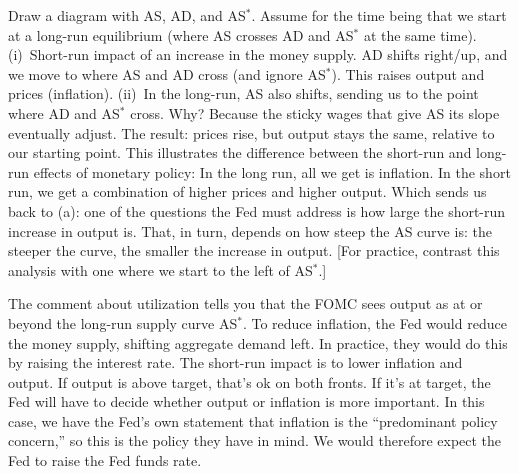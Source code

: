 \documentclass[letterpaper,12pt]{exam}
\begin{document}
\begin{questions}
\begin{solution}
\begin{parts}
\item Draw a diagram with AS, AD, and AS$^*$.
Assume for the time being that we start at a long-run equilibrium
(where AS crosses AD and AS$^*$ at the same time).
(i)~Short-run impact of an increase in the money supply.
AD shifts right/up, and we move to where AS and AD cross (and
ignore AS$^*$). This raises output and prices (inflation).
(ii)~In the long-run, AS also shifts, sending us to the point where AD and AS$^*$
cross. Why? Because the sticky wages that give AS its slope
eventually adjust. The result:
prices rise, but output stays the same, relative to our starting
point. This illustrates the difference between the short-run and
long-run effects of monetary policy:  In the long run, all we get is
inflation.  In the short run, we get a combination of higher prices
and higher output. Which sends us back to (a):  one of the questions
the Fed must address is how large the short-run increase in output
is.  That, in turn, depends on how steep the AS curve is:  the
steeper the curve, the smaller the increase in output. [For
practice, contrast this analysis with one where we start to the left
of AS$^*$.]

\item The comment about utilization tells you that
the FOMC sees output as at or beyond the long-run supply curve AS$^*$.
To reduce inflation, the Fed would reduce the money supply,
shifting aggregate demand left.
In practice, they would do this by raising the interest rate.
The short-run impact is to lower inflation and output.
If output is above target, that's ok on both fronts.
If it's at target, the Fed will have to decide whether output or inflation
is more important.
In this case, we have the Fed's own statement that inflation is the
``predominant policy concern,''
so this is the policy they have in mind.
We would therefore expect the Fed to raise the Fed funds rate.

\end{parts}
\end{solution}


\end{questions}
\end{document}
